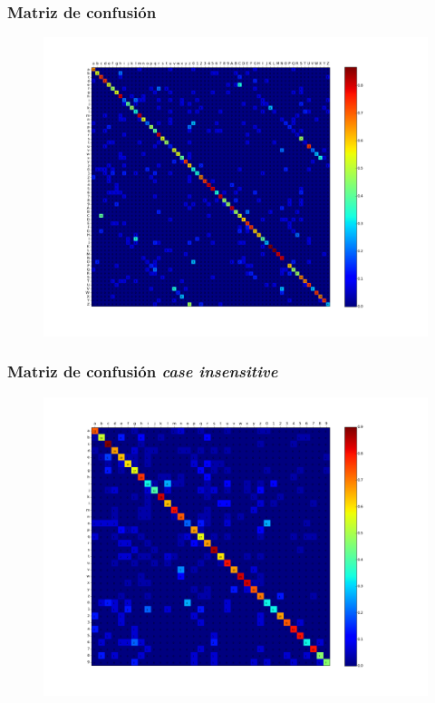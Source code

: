 		\begin{frame}
			\frametitle{Matriz de confusión}
			\begin{figure}[htbp!]
				\centering
				\centerline{
					\includegraphics[height=0.75\paperheight]{../img/resultados/mixtas/best_mean_matrix_Alpha0,01_2040-4.png}
				}
			\end{figure}
		\end{frame}
		\begin{frame}
			\frametitle{Matriz de confusión \textit{case insensitive}}
			\begin{figure}[htbp!]
				\centering
				\centerline{
					\includegraphics[height=0.75\paperheight]{../img/resultados/mixtas/best_mean_matrix_Alpha0,01_2040-4_ins.png}
				}
			\end{figure}
		\end{frame}